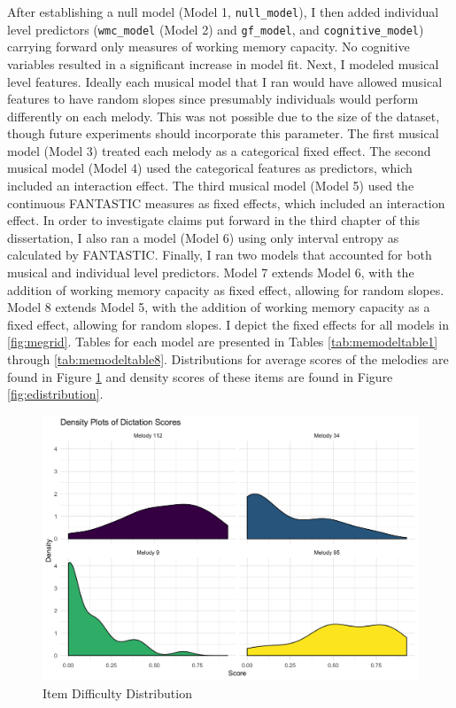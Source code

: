 \documentclass[12pt,]{book}
\begin{document}
After establishing a null model (Model 1, \texttt{null\_model}), I then added individual level predictors (\texttt{wmc\_model} (Model 2) and \texttt{gf\_model}, and \texttt{cognitive\_model}) carrying forward only measures of working memory capacity.
No cognitive variables resulted in a significant increase in model fit.
Next, I modeled musical level features.
Ideally each musical model that I ran would have allowed musical features to have random slopes since presumably individuals would perform differently on each melody.
This was not possible due to the size of the dataset, though future experiments should incorporate this parameter.
The first musical model (Model 3) treated each melody as a categorical fixed effect.
The second musical model (Model 4) used the categorical features as predictors, which included an interaction effect.
The third musical model (Model 5) used the continuous FANTASTIC measures as fixed effects, which included an interaction effect.
In order to investigate claims put forward in the third chapter of this dissertation, I also ran a model (Model 6) using only interval entropy as calculated by FANTASTIC.
Finally, I ran two models that accounted for both musical and individual level predictors.
Model 7 extends Model 6, with the addition of working memory capacity as fixed effect, allowing for random slopes.
Model 8 extends Model 5, with the addition of working memory capacity as a fixed effect, allowing for random slopes.
I depict the fixed effects for all models in \ref{fig:megrid}.
Tables for each model are presented in Tables \ref{tab:memodeltable1} through \ref{tab:memodeltable8}.
Distributions for average scores of the melodies are found in Figure \ref{fig:eboxplot} and density scores of these items are found in Figure \ref{fig:edistribution}.

\begin{figure}

{\centering \includegraphics[width=1\linewidth]{img/melody_difficulty} 

}

\caption{Item Difficulty Distribution}\label{fig:eboxplot}
\end{figure}
\end{document}
